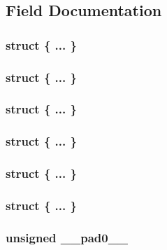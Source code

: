 \subsection{Field Documentation}
\hypertarget{union_b_d_stat_af5f1856b15a03758ef1d9c3327a35e3d}{\subsubsection[{"@12}]{\setlength{\rightskip}{0pt plus 5cm}struct \{ ... \} }}\label{union_b_d_stat_af5f1856b15a03758ef1d9c3327a35e3d}
\hypertarget{union_b_d_stat_ae9be2928dc8d381f9300425e581b6822}{\subsubsection[{"@14}]{\setlength{\rightskip}{0pt plus 5cm}struct \{ ... \} }}\label{union_b_d_stat_ae9be2928dc8d381f9300425e581b6822}
\hypertarget{union_b_d_stat_a882c4efeceee43253e1e8ce7a3c80fda}{\subsubsection[{"@16}]{\setlength{\rightskip}{0pt plus 5cm}struct \{ ... \} }}\label{union_b_d_stat_a882c4efeceee43253e1e8ce7a3c80fda}
\hypertarget{union_b_d_stat_a2d440dc669af38701a85eb4c57151286}{\subsubsection[{"@26}]{\setlength{\rightskip}{0pt plus 5cm}struct \{ ... \} }}\label{union_b_d_stat_a2d440dc669af38701a85eb4c57151286}
\hypertarget{union_b_d_stat_ae27254b7710e5513f3ebf0f4ef9180dc}{\subsubsection[{"@28}]{\setlength{\rightskip}{0pt plus 5cm}struct \{ ... \} }}\label{union_b_d_stat_ae27254b7710e5513f3ebf0f4ef9180dc}
\hypertarget{union_b_d_stat_a893ad9630e3f7f157e0c3f28583e2c1b}{\subsubsection[{"@30}]{\setlength{\rightskip}{0pt plus 5cm}struct \{ ... \} }}\label{union_b_d_stat_a893ad9630e3f7f157e0c3f28583e2c1b}
\hypertarget{union_b_d_stat_adf71f3d8410c1f1dbbc96680a92c49af}{
\subsubsection[{\-\_\-\-\_\-pad0\-\_\-\-\_\-}]{\setlength{\rightskip}{0pt plus 5cm}unsigned \-\_\-\-\_\-pad0\-\_\-\-\_\-}}\label{union_b_d_stat_adf71f3d8410c1f1dbbc96680a92c49af}


